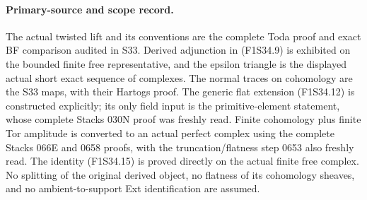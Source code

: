 \paragraph{Primary-source and scope record.}
The actual twisted lift and its conventions
are the complete Toda proof and exact BF
comparison audited in S33.
Derived adjunction in (F1S34.9) is exhibited
on the bounded finite free representative,
and the epsilon triangle is the displayed
actual short exact sequence of complexes.
The normal traces on cohomology are the
S33 maps, with their Hartogs proof.
The generic flat extension (F1S34.12)
is constructed explicitly; its only field
input is the primitive-element statement,
whose complete Stacks 030N proof was
freshly read.
Finite cohomology plus finite Tor amplitude
is converted to an actual perfect complex
using the complete Stacks 066E and 0658
proofs, with the truncation/flatness step
0653 also freshly read.
The identity (F1S34.15) is proved directly
on the actual finite free complex.
No splitting of the original derived
object, no flatness of its cohomology
sheaves, and no ambient-to-support Ext
identification are assumed.
